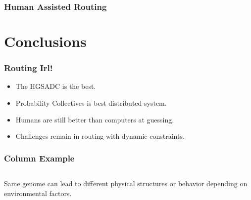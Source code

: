 \documentclass{beamer}
\begin{document}
\begin{frame}
\frametitle{Human Assisted Routing}
\end{frame}

\section{Conclusions}

\begin{frame}
\frametitle{Routing Irl!}
	\begin{itemize}
		\item The HGSADC is the best.	
		\item Probability Collectives is best distributed system.
		\item Humans are still better than computers at guessing.
		\item Challenges remain in  routing with dynamic constraints.
	\end{itemize}
\end{frame}

\begin{frame}
  \frametitle{Column Example}
  \begin{columns}
  \begin{column}{.65\textwidth}
Same genome can lead to different physical structures or behavior depending on environmental factors.
  \end{column}
  \end{columns}
\end{frame}
\end{document}

